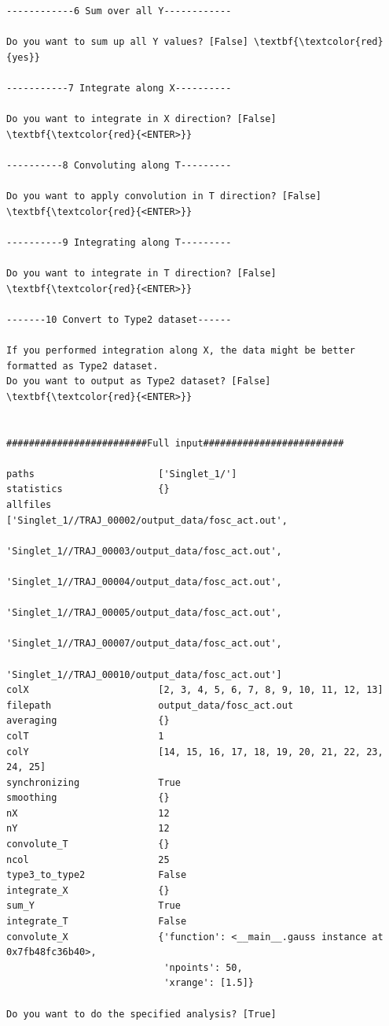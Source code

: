 \documentclass[a4paper,11pt,DIV=15,openany]{scrbook}
\begin{document}
\begin{oframed}
\begin{Verbatim}[commandchars=\\\{\}]
------------6 Sum over all Y------------

Do you want to sum up all Y values? [False] \textbf{\textcolor{red}{yes}}

-----------7 Integrate along X----------

Do you want to integrate in X direction? [False] \textbf{\textcolor{red}{<ENTER>}}

----------8 Convoluting along T---------

Do you want to apply convolution in T direction? [False] \textbf{\textcolor{red}{<ENTER>}}

----------9 Integrating along T---------

Do you want to integrate in T direction? [False] \textbf{\textcolor{red}{<ENTER>}}

-------10 Convert to Type2 dataset------

If you performed integration along X, the data might be better formatted as Type2 dataset.
Do you want to output as Type2 dataset? [False] \textbf{\textcolor{red}{<ENTER>}}


#########################Full input#########################

paths                      ['Singlet_1/']
statistics                 {}
allfiles                   ['Singlet_1//TRAJ_00002/output_data/fosc_act.out',
                            'Singlet_1//TRAJ_00003/output_data/fosc_act.out',
                            'Singlet_1//TRAJ_00004/output_data/fosc_act.out', 
                            'Singlet_1//TRAJ_00005/output_data/fosc_act.out', 
                            'Singlet_1//TRAJ_00007/output_data/fosc_act.out', 
                            'Singlet_1//TRAJ_00010/output_data/fosc_act.out']
colX                       [2, 3, 4, 5, 6, 7, 8, 9, 10, 11, 12, 13]
filepath                   output_data/fosc_act.out
averaging                  {}
colT                       1
colY                       [14, 15, 16, 17, 18, 19, 20, 21, 22, 23, 24, 25]
synchronizing              True
smoothing                  {}
nX                         12
nY                         12
convolute_T                {}
ncol                       25
type3_to_type2             False
integrate_X                {}
sum_Y                      True
integrate_T                False
convolute_X                {'function': <__main__.gauss instance at 0x7fb48fc36b40>, 
                            'npoints': 50, 
                            'xrange': [1.5]}

Do you want to do the specified analysis? [True] 




\end{Verbatim}
\end{oframed}
\end{document}
